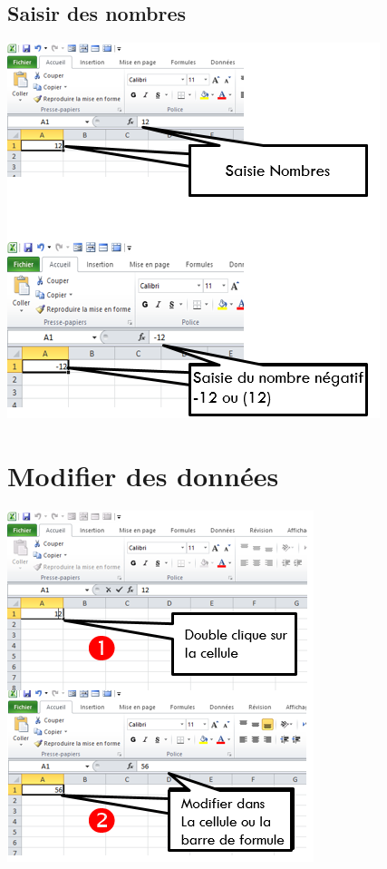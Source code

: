 \subsection{ Saisir des nombres }
\begin{center} 
	\includegraphics[scale=0.2,width=0.6\linewidth]{img/saisie_nombre} 
\end{center}
\section{Modifier des données} 
\begin{center} 
	\includegraphics[scale=0.2,width=0.6\linewidth]{img/modification_donner} 
\end{center}
